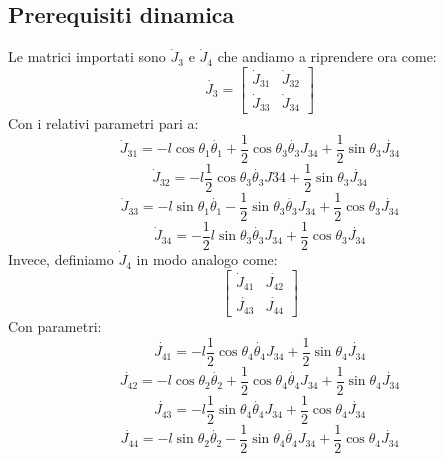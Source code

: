 \subsection{Prerequisiti dinamica}\label{appendice:t34punto}
Le matrici importati sono $\dot{J}_3$ e $\dot{J}_4$ che andiamo a riprendere ora come:
\begin{equation}
\dot{J_3} =
\begin{bmatrix}
 	\dot{J}_{31} & \dot{J}_{32} \\ 
 	\dot{J}_{33} & \dot{J}_{34}
 \end{bmatrix}
\end{equation}
Con i relativi parametri pari a:
\begin{equation*}
\dot{J}_{31} = -l\cos\theta_1\dot{\theta_1}+\frac{1}{2}\cos\theta_3\dot{\theta_3}J_{34}+\frac{1}{2}\sin\theta_3\dot{J_{34}}
\end{equation*}
\begin{equation*}
\dot{J}_{32} =   -l\frac{1}{2}\cos\theta_3\dot{\theta_3}J34+\frac{1}{2}\sin\theta_3\dot{J_{34}} 
\end{equation*}
\begin{equation*}
\dot{J}_{33} =  -l\sin\theta_1\dot{\theta_1}-\frac{1}{2}\sin\theta_3\dot{\theta_3}J_{34}+\frac{1}{2}\cos\theta_3\dot{J_{34}}
\end{equation*}
\begin{equation*}
\dot{J}_{34} = -\frac{1}{2}l\sin\theta_3\dot{\theta_3}J_{34}+\frac{1}{2}\cos\theta_3\dot{J_{34}}
\end{equation*}
Invece, definiamo $\dot{J}_4$ in modo analogo come:
\begin{equation}
\begin{bmatrix}
\dot{J}_{41}  & \dot{J_{42}} \\ \dot{J_{43}} & \dot{J_{44}}
\end{bmatrix}
\end{equation}
Con parametri:
\begin{equation*}
\dot{J_{41}}= -l﻿\frac{1}{2}\cos\theta_4\dot{\theta_4}J_{34}+﻿\frac{1}{2}\sin\theta_4\dot{J_{34}}
\end{equation*}
\begin{equation*}
\dot{J_{42}}= -l\cos\theta_2\dot{\theta_2}+﻿\frac{1}{2}\cos\theta_4\dot{\theta_4}J_{34}+﻿\frac{1}{2}\sin\theta_4\dot{J_{34}}
\end{equation*}
\begin{equation*}
\dot{J_{43}}=  -l\frac{1}{2}\sin\theta_4\dot{\theta_4}J_{34}+﻿\frac{1}{2}\cos\theta_4\dot{J_{34}}          
\end{equation*}
\begin{equation*}
\dot{J_{44}}= -l\sin\theta_2\dot{\theta_2}-﻿\frac{1}{2}\sin\theta_4\dot{\theta_4}J_{34}+﻿\frac{1}{2}\cos\theta_4\dot{J_{34}}
\end{equation*}
